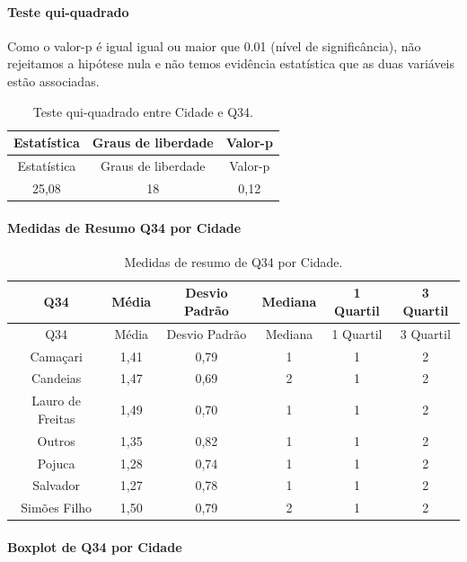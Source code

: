 \documentclass[]{article}
\let\oldparagraph\paragraph
\renewcommand{\paragraph}[1]{\oldparagraph{#1}\mbox{}}
\begin{document}
\hypertarget{teste-qui-quadrado-102}{%
\paragraph{Teste qui-quadrado}\label{teste-qui-quadrado-102}}

Como o valor-p é igual igual ou maior que 0.01 (nível de significância), não rejeitamos a hipótese nula e não temos evidência estatística que as duas variáveis estão associadas.

\begin{longtable}[]{@{}ccc@{}}
\caption{\label{tab:unnamed-chunk-1196}Teste qui-quadrado entre Cidade e Q34.}\tabularnewline
\toprule
Estatística & Graus de liberdade & Valor-p\tabularnewline
\midrule
\endfirsthead
\toprule
Estatística & Graus de liberdade & Valor-p\tabularnewline
\midrule
\endhead
25,08 & 18 & 0,12\tabularnewline
\bottomrule
\end{longtable}

\cleardoublepage

\hypertarget{medidas-de-resumo-q34-por-cidade}{%
\paragraph{Medidas de Resumo Q34 por Cidade}\label{medidas-de-resumo-q34-por-cidade}}

\begin{longtable}[]{@{}cccccc@{}}
\caption{\label{tab:unnamed-chunk-1197}Medidas de resumo de Q34 por Cidade.}\tabularnewline
\toprule
Q34 & Média & Desvio Padrão & Mediana & 1 Quartil & 3 Quartil\tabularnewline
\midrule
\endfirsthead
\toprule
Q34 & Média & Desvio Padrão & Mediana & 1 Quartil & 3 Quartil\tabularnewline
\midrule
\endhead
Camaçari & 1,41 & 0,79 & 1 & 1 & 2\tabularnewline
Candeias & 1,47 & 0,69 & 2 & 1 & 2\tabularnewline
Lauro de Freitas & 1,49 & 0,70 & 1 & 1 & 2\tabularnewline
Outros & 1,35 & 0,82 & 1 & 1 & 2\tabularnewline
Pojuca & 1,28 & 0,74 & 1 & 1 & 2\tabularnewline
Salvador & 1,27 & 0,78 & 1 & 1 & 2\tabularnewline
Simões Filho & 1,50 & 0,79 & 2 & 1 & 2\tabularnewline
\bottomrule
\end{longtable}

\hypertarget{boxplot-de-q34-por-cidade}{%
\paragraph{Boxplot de Q34 por Cidade}\label{boxplot-de-q34-por-cidade}}
\end{document}
